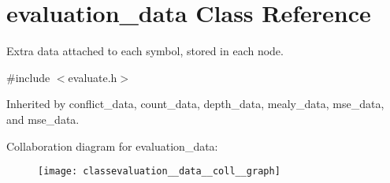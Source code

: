 \hypertarget{classevaluation__data}{}\section{evaluation\+\_\+data Class Reference}
\label{classevaluation__data}


Extra data attached to each symbol, stored in each node.  




{\ttfamily \#include $<$evaluate.\+h$>$}



Inherited by conflict\+\_\+data, count\+\_\+data, depth\+\_\+data, mealy\+\_\+data, mse\+\_\+data, and mse\+\_\+data.



Collaboration diagram for evaluation\+\_\+data\+:\nopagebreak
\begin{figure}[H]
\begin{center}
\leavevmode
\texttt{[image: classevaluation\_\_data\_\_coll\_\_graph]}
\end{center}
\end{figure}
